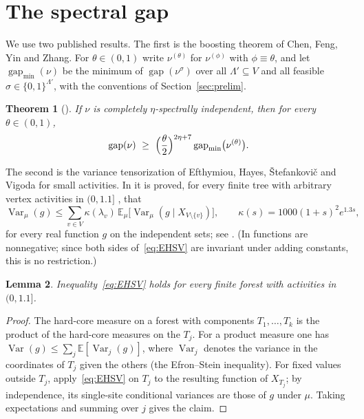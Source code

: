 \documentclass{amsart}
\numberwithin{equation}{section}
\numberwithin{table}{section}
\newtheorem{theorem}{Theorem}[section]
\newtheorem{lemma}[theorem]{Lemma}
\theoremstyle{definition}
\theoremstyle{remark}
\newcommand{\E}{\mathbb{E}}
\newcommand{\Var}{\operatorname{Var}}
\newcommand{\gap}{\operatorname{gap}}
\begin{document}
\section{The spectral gap}\label{sec:gap}

We use two published results. The first is the boosting theorem of Chen, Feng, Yin and Zhang. For $\theta\in(0,1)$ write $\nu^{(\theta)}$ for $\nu^{(\phi)}$ with $\phi\equiv\theta$, and let $\gap_{\min}(\nu)$ be the minimum of $\gap(\nu^\sigma)$ over all $\Lambda'\subseteq V$ and all feasible $\sigma\in\{0,1\}^{\Lambda'}$, with the conventions of Section~\ref{sec:prelim}.

\begin{theorem}[{\cite[Theorem~1.9]{CFYZ}}]\label{thm:CFYZ}
If $\nu$ is completely $\eta$-spectrally independent, then for every $\theta\in(0,1)$,
\[
\gap(\nu)\ \ge\ \Bigl(\frac\theta2\Bigr)^{2\eta+7}\gap_{\min}\bigl(\nu^{(\theta)}\bigr).
\]
\end{theorem}

The second is the variance tensorization of Efthymiou, Hayes, \v{S}tefankovi\v{c} and Vigoda for small activities. In \cite[Section~3]{EHSV} it is proved, for every finite tree with arbitrary vertex activities in $(0,1.1]$ \cite[(11)]{EHSV}, that
\begin{equation}\label{eq:EHSV}
\Var_\mu(g)\le\sum_{v\in V}\kappa(\lambda_v)\,\E_\mu\bigl[\Var_\mu(g\mid X_{V\setminus\{v\}})\bigr],\qquad \kappa(s)=1000(1+s)^2e^{1.3s},
\end{equation}
for every real function $g$ on the independent sets; see \cite[(12) and Lemma~3.1]{EHSV}. (In \cite[Definition~2.1]{EHSV} functions are nonnegative; since both sides of~\eqref{eq:EHSV} are invariant under adding constants, this is no restriction.)

\begin{lemma}\label{lem:EHSVforest}
Inequality~\eqref{eq:EHSV} holds for every finite forest with activities in $(0,1.1]$.
\end{lemma}

\begin{proof}
The hard-core measure on a forest with components $T_1,\dots,T_k$ is the product of the hard-core measures on the $T_j$. For a product measure one has $\Var(g)\le\sum_j\E[\Var_j(g)]$, where $\Var_j$ denotes the variance in the coordinates of $T_j$ given the others (the Efron--Stein inequality). For fixed values outside $T_j$, apply~\eqref{eq:EHSV} on $T_j$ to the resulting function of $X_{T_j}$; by independence, its single-site conditional variances are those of $g$ under $\mu$. Taking expectations and summing over $j$ gives the claim.
\end{proof}
\end{document}
